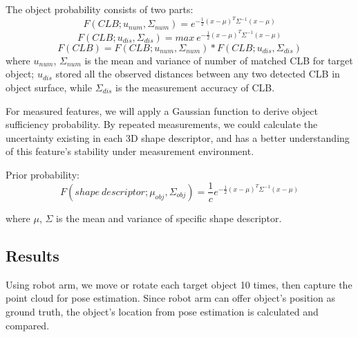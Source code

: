\documentclass{ieeeaccess}
\begin{document}
The object probability consists of two parts:
\begin{equation}
F(CLB;u_{num},\Sigma_{num})=e^{-\frac{1}{2}(x-\mu)^T\Sigma^{-1}(x-\mu)}
\end{equation}
\begin{equation}
F(CLB;u_{dis},\Sigma_{dis})=max\ e^{-\frac{1}{2}(x-\mu)^T\Sigma^{-1}(x-\mu)}%
\end{equation}
\begin{equation}
F(CLB)=F(CLB;u_{num},\Sigma_{num})*F(CLB;u_{dis},\Sigma_{dis})
\end{equation}
where $u_{num}$, $\Sigma_{num}$ is the mean and variance of number of
matched CLB for target object; $u_{dis}$ stored all the observed
distances between any two detected CLB in object surface,
while $\Sigma_{dis}$ is the measurement accuracy of CLB.

For measured features, we will apply a Gaussian function
to derive object sufficiency probability. By repeated
measurements, we could calculate the uncertainty existing in
each 3D shape descriptor, and has a better understanding of
this feature’s stability under measurement environment.

Prior probability:
\begin{equation}
F(shape\ descriptor;\mu_{obj},\Sigma_{obj})=\frac{1}{c}e^{-\frac{1}{2}(x-\mu)^T\Sigma^{-1}(x-\mu)}
\end{equation}

where $\mu$, $\Sigma$ is the mean and variance of specific shape
descriptor.
\subsection{Results}
Using robot arm, we move or rotate each target object 10
times, then capture the point cloud for pose estimation. Since
robot arm can offer object’s position as ground truth, the
object’s location from pose estimation is calculated and
compared.
\end{document}
